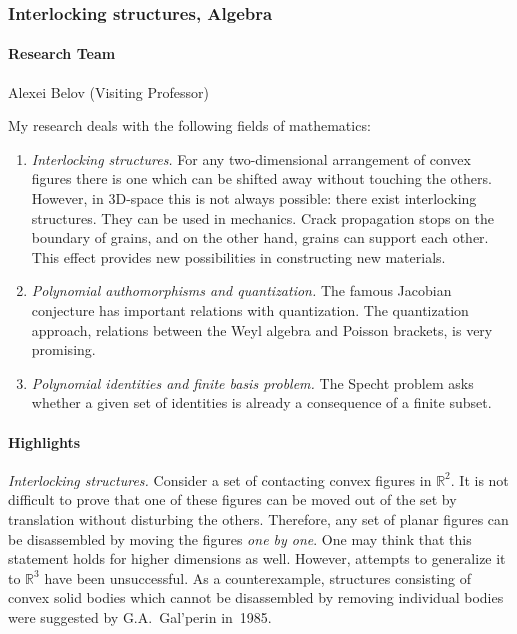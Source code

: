 
\subsubsection{Interlocking structures, Algebra}
\label{is:belov}

\paragraph{Research Team}
Alexei Belov (Visiting Professor)

\medskip

My research deals with the following fields of mathematics:
\begin{enumerate}
\item {\sl Interlocking structures.}
  For any two-dimensional arrangement of convex figures there is one which can
  be shifted away without touching the others.  However, in 3D-space this is
  not always possible: there exist interlocking structures. They can be used in
  mechanics. Crack propagation stops on the boundary of grains, and on the
  other hand, grains can support each other. This effect provides new
  possibilities in constructing new materials.

\item {\sl Polynomial authomorphisms and quantization.}
  The famous Jacobian conjecture has important relations with quantization. The
  quantization approach, relations between the Weyl algebra and Poisson
  brackets, is very promising.

\item {\sl Polynomial identities and finite basis problem.}
  The Specht problem asks whether a given set of identities is already a
  consequence of a finite subset.
\end{enumerate}

\paragraph{Highlights} {\sl Interlocking structures.} Consider a set of
contacting convex figures in ${\mathbb R}^2$. It is not difficult to prove that
one of these figures can be moved out of the set by translation without
disturbing the others. Therefore, any set of planar figures can be disassembled
by moving the figures \emph{one by one}. One may think that this statement
holds for higher dimensions as well. However, attempts to generalize it to
${\mathbb R}^3$ have been unsuccessful. As a counterexample, structures
consisting of convex solid bodies which cannot be disassembled by removing
individual bodies were suggested by G.A.~Gal'perin in~1985.

